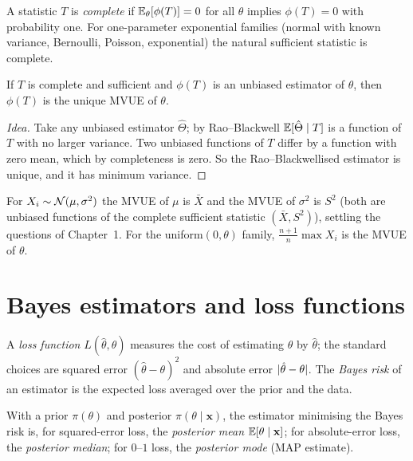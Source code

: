 \begin{definition}
A statistic $T$ is \emph{complete} if $\mathbb{E}_\theta[\phi(T)]=0$ for all $\theta$ implies $\phi(T)=0$ with probability one. For one-parameter exponential families (normal with known variance, Bernoulli, Poisson, exponential) the natural sufficient statistic is complete.
\end{definition}

\begin{theorem}\label{thm:lehmann}
If $T$ is complete and sufficient and $\phi(T)$ is an unbiased estimator of $\theta$, then $\phi(T)$ is the unique MVUE of $\theta$.
\end{theorem}

\begin{proof}[Idea]
Take any unbiased estimator $\hat\Theta$; by Rao--Blackwell $\mathbb{E}[\hat\Theta\mid T]$ is a function of $T$ with no larger variance. Two unbiased functions of $T$ differ by a function with zero mean, which by completeness is zero. So the Rao--Blackwellised estimator is unique, and it has minimum variance.
\end{proof}

\begin{example}
For $X_i\sim\mathcal{N}(\mu,\sigma^2)$ the MVUE of $\mu$ is $\bar{X}$ and the MVUE of $\sigma^2$ is $S^2$ (both are unbiased functions of the complete sufficient statistic $(\bar{X},S^2)$), settling the questions of Chapter~1. For the uniform$(0,\theta)$ family, $\frac{n+1}n\max X_i$ is the MVUE of $\theta$.
\end{example}

\section{Bayes estimators and loss functions}

A \emph{loss function} $L(\hat\theta,\theta)$ measures the cost of estimating $\theta$ by $\hat\theta$; the standard choices are squared error $(\hat\theta-\theta)^2$ and absolute error $\lvert\hat\theta-\theta\rvert$. The \emph{Bayes risk} of an estimator is the expected loss averaged over the prior and the data.

\begin{theorem}\label{thm:bayes}
With a prior $\pi(\theta)$ and posterior $\pi(\theta\mid\mathbf{x})$, the estimator minimising the Bayes risk is, for squared-error loss, the \emph{posterior mean} $\mathbb{E}[\theta\mid\mathbf{x}]$; for absolute-error loss, the \emph{posterior median}; for $0$--$1$ loss, the \emph{posterior mode} (MAP estimate).
\end{theorem}

